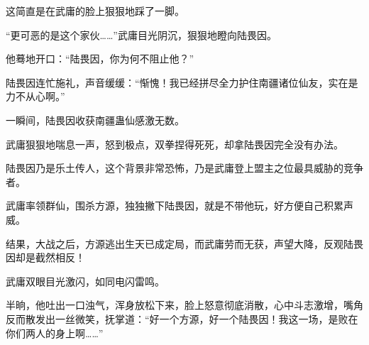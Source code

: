 \begin{this_body}
这简直是在武庸的脸上狠狠地踩了一脚。

“更可恶的是这个家伙……”武庸目光阴沉，狠狠地瞪向陆畏因。

他蓦地开口：“陆畏因，你为何不阻止他？”

陆畏因连忙施礼，声音缓缓：“惭愧！我已经拼尽全力护住南疆诸位仙友，实在是力不从心啊。”

一瞬间，陆畏因收获南疆蛊仙感激无数。

武庸狠狠地喘息一声，怒到极点，双拳捏得死死，却拿陆畏因完全没有办法。

陆畏因乃是乐土传人，这个背景非常恐怖，乃是武庸登上盟主之位最具威胁的竞争者。

武庸率领群仙，围杀方源，独独撇下陆畏因，就是不带他玩，好方便自己积累声威。

结果，大战之后，方源逃出生天已成定局，而武庸劳而无获，声望大降，反观陆畏因却是截然相反！

武庸双眼目光激闪，如同电闪雷鸣。

半晌，他吐出一口浊气，浑身放松下来，脸上怒意彻底消散，心中斗志激增，嘴角反而散发出一丝微笑，抚掌道：“好一个方源，好一个陆畏因！我这一场，是败在你们两人的身上啊……”

\end{this_body}

